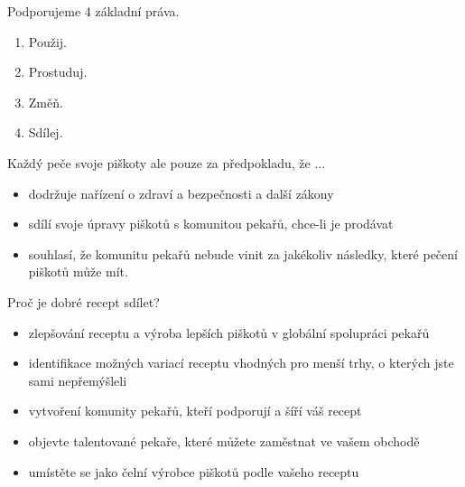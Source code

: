 \documentclass[11pt]{beamer}
\begin{document}
\begin{frame}{Podporujeme 4 základní práva.}
	\begin{enumerate}
		\item Použij.
		\item Prostuduj.
		\item Změň.
		\item Sdílej.
	\end{enumerate}
\end{frame}

\begin{frame}{Každý peče svoje piškoty}
	ale pouze za předpokladu, že $\ldots$
	\begin{itemize}
		\item dodržuje nařízení o zdraví a bezpečnosti a další zákony
		\item sdílí svoje úpravy piškotů s komunitou pekařů, chce-li je prodávat
		\item souhlasí, že komunitu pekařů nebude vinit za jakékoliv následky, které pečení piškotů může mít.
	\end{itemize}
\end{frame}

\begin{frame}{Proč je dobré recept sdílet?}
	\begin{itemize}
		\item zlepšování receptu a výroba lepších piškotů v globální spolupráci pekařů
		\item identifikace možných variací receptu vhodných pro menší trhy, o kterých jste sami nepřemýšleli
		\item vytvoření komunity pekařů, kteří podporují a šíří váš recept
		\item objevte talentované pekaře, které můžete zaměstnat ve vašem obchodě
		\item umístěte se jako čelní výrobce piškotů podle vašeho receptu
	\end{itemize}
\end{frame}
\end{document}
